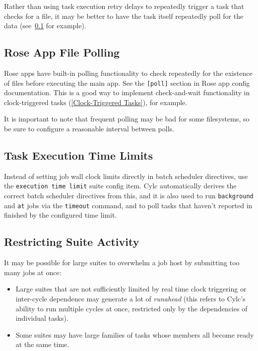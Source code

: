 Rather than using task execution retry delays to repeatedly trigger a task that
checks for a file, it may be better to have the task itself repeatedly poll for
the data (see~\ref{Rose App File Polling} for example).

\subsection{Rose App File Polling}
\label{Rose App File Polling}

Rose apps have built-in polling functionality to check repeatedly for the
existence of files before executing the main app. See the \lstinline=[poll]=
section in Rose app config documentation. This is a good way to implement
check-and-wait functionality in clock-triggered tasks (\ref{Clock-Triggered
Tasks}), for example.

It is important to note that frequent polling may be bad for some filesystems,
so be sure to configure a reasonable interval between polls. 

\subsection{Task Execution Time Limits}

Instead of setting job wall clock limits directly in batch scheduler
directives, use the \lstinline=execution time limit= suite config item.
Cylc automatically derives the correct batch scheduler directives from this,
and it is also used to run \lstinline=background= and \lstinline=at= jobs via
the \lstinline=timeout= command, and to poll tasks that haven't reported in
finished by the configured time limit.

\subsection{Restricting Suite Activity}
\label{Restricting Suite Activity}

It may be possible for large suites to overwhelm a job host by submitting too
many jobs at once:

\begin{itemize}
  \item Large suites that are not sufficiently limited by real time clock
      triggering or inter-cycle dependence may generate a lot of {\em runahead}
      (this refers to Cylc's ability to run multiple cycles at once, restricted
      only by the dependencies of individual tasks).
  \item Some suites may have large families of tasks whose members all
    become ready at the same time.
\end{itemize}

